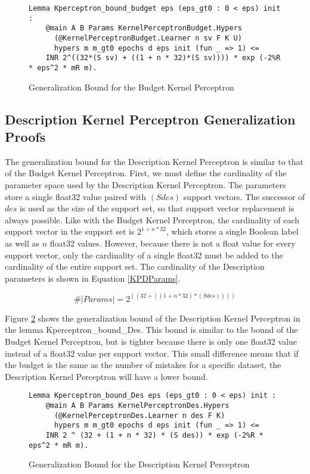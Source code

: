 \begin{figure}
    \caption{Generalization Bound for the Budget Kernel Perceptron}
    \label{KPBLemma}
    \begin{lstlisting}
Lemma Kperceptron_bound_budget eps (eps_gt0 : 0 < eps) init : 
    @main A B Params KernelPerceptronBudget.Hypers 
      (@KernelPerceptronBudget.Learner n sv F K U)
      hypers m m_gt0 epochs d eps init (fun _ => 1) <=
    INR 2^((32*(S sv) + ((1 + n * 32)*(S sv)))) * exp (-2%R * eps^2 * mR m).
    \end{lstlisting}
\end{figure}

\subsection{Description Kernel Perceptron Generalization Proofs}\label{KPDProofs}

The generalization bound for the Description Kernel Perceptron is similar to that of the Budget Kernel Perceptron. First, we must define the cardinality of the parameter space used by the Description Kernel Perceptron. The parameters store a single float32 value paired with $(S des)$ support vectors. The successor of $des$ is used as the size of the support set, so that support vector replacement is always possible. Like with the Budget Kernel Perceptron, the cardinality of each support vector in the support set is $2^{1 + n * 32}$, which stores a single Boolean label as well as $n$ float32 values. However, because there is not a float value for every support vector, only the cardinality of a single float32 must be added to the cardinality of the entire support set. The cardinality of the Description parameters is shown in Equation \ref{KPDParams}.

\begin{equation} \label{KPDParams}
 \#|Params| = 2^{((32 + ((1 + n * 32)*(S des))))}
\end{equation}

Figure \ref{KPDLemma} shows the generalization bound of the Description Kernel Perceptron in the lemma Kperceptron\_bound\_Des. This bound is similar to the bound of the Budget Kernel Perceptron, but is tighter because there is only one float32 value instead of a float32 value per support vector. This small difference means that if the budget is the same as the number of mistakes for a specific dataset, the Description Kernel Perceptron will have a lower bound. 

\begin{figure}
    \caption{Generalization Bound for the Description Kernel Perceptron}
    \label{KPDLemma}
    \begin{lstlisting}
Lemma Kperceptron_bound_Des eps (eps_gt0 : 0 < eps) init : 
    @main A B Params KernelPerceptronDes.Hypers 
      (@KernelPerceptronDes.Learner n des F K)
      hypers m m_gt0 epochs d eps init (fun _ => 1) <=
    INR 2 ^ (32 + (1 + n * 32) * (S des)) * exp (-2%R * eps^2 * mR m).
    \end{lstlisting}
\end{figure}


